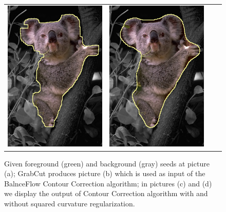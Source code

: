 \begin{figure}[]
\begin{tabular}{cccc}
 	\includegraphics[scale=0.25]{figures/chapter7/segmentation/coala/k-0.0/corrected-seg.png} &  	
 	\includegraphics[scale=0.25]{figures/chapter7/segmentation/coala/k-1.0/corrected-seg.png}
\end{tabular}	
\caption{Given foreground (green) and background (gray) seeds at picture (a); GrabCut produces picture (b) which is used as input of the BalnceFlow Contour Correction algorithm; in pictures (c) and (d) we display the output of Contour Correction algorithm with and without squared curvature regularization. }
\label{fig:ch7-segmentation}
\end{figure}


